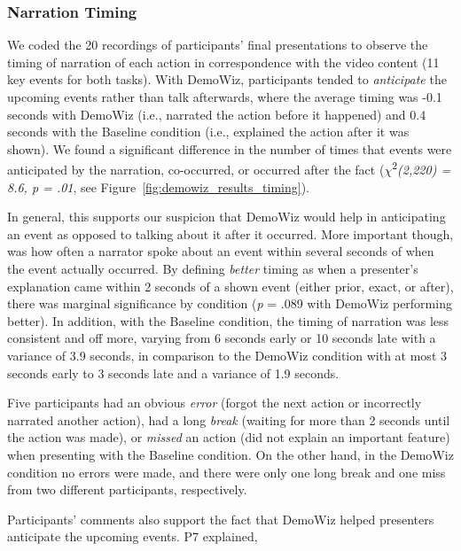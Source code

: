 \subsubsection{Narration Timing}
We coded the 20 recordings of participants' final presentations to observe the timing of narration of each action in correspondence with the video content (11 key events for both tasks). With DemoWiz, participants tended to \textit{anticipate} the upcoming events rather than talk afterwards, where the average timing was -0.1 seconds with DemoWiz (i.e., narrated the action before it happened) and 0.4 seconds with the Baseline condition (i.e., explained the action after it was shown). We found a significant difference in the number of times that events were anticipated by the narration, co-occurred, or occurred after the fact ($\chi $\textsuperscript{2}\textit{(2,220) = 8.6, p = .01}, see Figure~\ref{fig:demowiz_results_timing}).

In general, this supports our suspicion that DemoWiz would help in anticipating an event as opposed to talking about it after it occurred. More important though, was how often a narrator spoke about an event within several seconds of when the event actually occurred. By defining \textit{better} timing as when a presenter's explanation came within 2 seconds of a shown event (either prior, exact, or after), there was marginal significance by condition (\textit{p} = .089 with DemoWiz performing better). In addition, with the Baseline condition, the timing of narration was less consistent and off more, varying from 6 seconds early or 10 seconds late with a variance of 3.9 seconds, in comparison to the DemoWiz condition with at most 3 seconds early to 3 seconds late and a variance of 1.9 seconds.

Five participants had an obvious \textit{error} (forgot the next action or incorrectly narrated another action), had a long \textit{break} (waiting for more than 2 seconds until the action was made), or \textit{missed} an action (did not explain an important feature) when presenting with the Baseline condition. On the other hand, in the DemoWiz condition no errors were made, and there were only one long break and one miss from two different participants, respectively.

Participants' comments also support the fact that DemoWiz helped presenters anticipate the upcoming events. P7 explained, 

